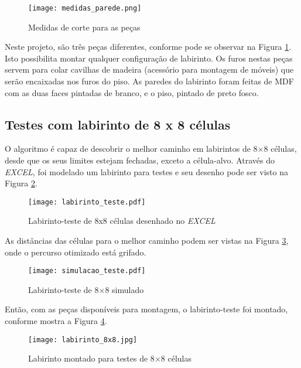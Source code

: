 \begin{figure}[!htb]
	\caption{\label{fig:medidas_parede}Medidas de corte para as peças}
	\begin{center}
		\texttt{[image: medidas\_parede.png]}
	\end{center}
\end{figure}

 Neste projeto, são três peças diferentes, conforme pode se observar na Figura \ref{fig:medidas_parede}. Isto possibilita montar qualquer configuração de labirinto. Os furos nestas peças servem para colar cavilhas de madeira (acessório para montagem de móveis) que serão encaixadas nos furos do piso.
As paredes do labirinto foram feitas de MDF com as duas faces pintadas de branco, e o piso, pintado de preto fosco.

\subsection{Testes com labirinto de 8 x 8 células}

O algoritmo é capaz de descobrir o melhor caminho em labirintos de 8$\times$8 células, desde que os seus limites estejam fechadas, exceto a célula-alvo. Através do \textit{EXCEL}, foi modelado um labirinto para testes e seu desenho pode ser visto na Figura \ref{fig:labteste1}.
\begin{figure}[!htb]
	\caption{\label{fig:labteste1}Labirinto-teste de 8x8 células desenhado no \textit{EXCEL}}
	\begin{center}
		\texttt{[image: labirinto\_teste.pdf]}
	\end{center}
\end{figure}

 As distâncias das células para o melhor caminho podem ser vistas na Figura \ref{fig:labteste2}, onde o percurso otimizado está grifado.
 
\begin{figure}[!htb]
	\caption{\label{fig:labteste2}Labirinto-teste de 8$\times$8 simulado}
	\begin{center}
		\texttt{[image: simulacao\_teste.pdf]}
	\end{center}
\end{figure}


Então, com as peças disponíveis para montagem, o labirinto-teste foi montado, conforme mostra a Figura \ref{fig:labteste3}.
\begin{figure}[!htb]
	\caption{\label{fig:labteste3}Labirinto montado para testes de 8$\times$8 células}
	\begin{center}
		\texttt{[image: labirinto\_8x8.jpg]}
	\end{center}
\end{figure}

